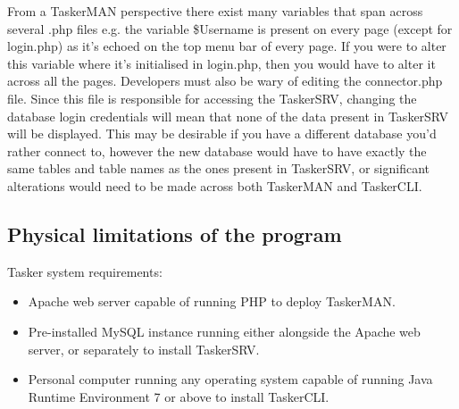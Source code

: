 \documentclass{project}
\begin{document}
From a TaskerMAN perspective there exist many variables that span across several .php files e.g. the variable \$Username is present on every page (except for login.php) as it's echoed on the top menu bar of every page. If you were to alter this variable where it's initialised in login.php, then you would have to alter it across all the pages. Developers must also be wary of editing the connector.php file. Since this file is responsible for accessing the TaskerSRV, changing the database login credentials will mean that none of the data present in TaskerSRV will be displayed. This may be desirable if you have a different database you'd rather connect to, however the new database would have to have exactly the same tables and table names as the ones present in TaskerSRV, or significant alterations would need to be made across both TaskerMAN and TaskerCLI.
\subsection{Physical limitations of the program}
Tasker system requirements:
\begin{itemize}
  \item Apache web server capable of running PHP to deploy TaskerMAN.
  \item Pre-installed MySQL instance running either alongside the Apache web server, or
    separately to install TaskerSRV.
  \item Personal computer running any operating system capable of running Java Runtime
    Environment 7 or above to install TaskerCLI.
\end{itemize}
\end{document}
